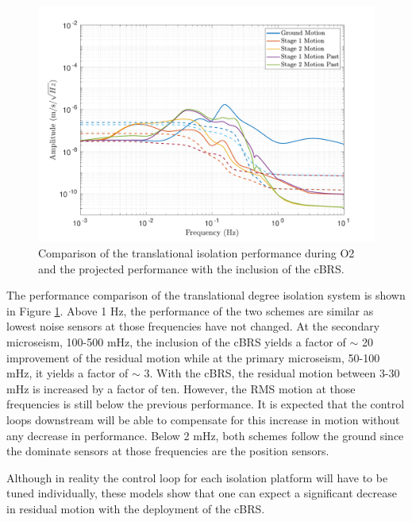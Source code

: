 \documentclass [12pt, proquest]{uwthesis}[2019]
\begin{document}
\begin{figure}[!h]
\begin{center}
\includegraphics[width=\textwidth]{cBRS_Model_CompX.pdf}
\caption[Comparison of the translational isolation performance during O2 and the projected performance with the inclusion of the cBRS]{Comparison of the translational isolation performance during O2 and the projected performance with the inclusion of the cBRS.}
\label{cBRSCompX}
\end{center}
\end{figure}

The performance comparison of the translational degree isolation system is shown in Figure \ref{cBRSCompX}. Above 1 Hz, the performance of the two schemes are similar as lowest noise sensors at those frequencies have not changed. At the secondary microseism, 100-500 mHz, the inclusion of the cBRS yields a factor of $\sim$ 20 improvement of the residual motion while at the primary microseism, 50-100 mHz, it yields a factor of $\sim$ 3. With the cBRS, the residual motion between 3-30 mHz is increased by a factor of ten. However, the RMS motion at those frequencies is still below the previous performance. It is expected that the control loops downstream will be able to compensate for this increase in motion without any decrease in performance. Below 2 mHz, both schemes follow the ground since the dominate sensors at those frequencies are the position sensors.

Although in reality the control loop for each isolation platform will have to be tuned individually, these models show that one can expect a significant decrease in residual motion with the deployment of the cBRS.
\end{document}
